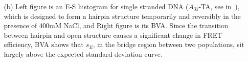 \label{fig:bva_dynamic} (b) Left figure is an E-S histogram for single stranded DNA ($A_{31}$-TA, see in~\cite{Tsukanov_2013}), which is designed to form a hairpin structure temporarily and reversibly in the presence of 400mM NaCl, and Right figure is its BVA. Since the transition between hairpin and open structure causes a significant change in FRET efficiency, BVA shows that $s_E$, in the bridge region between two populations, sit largely above the expected standard deviation curve.